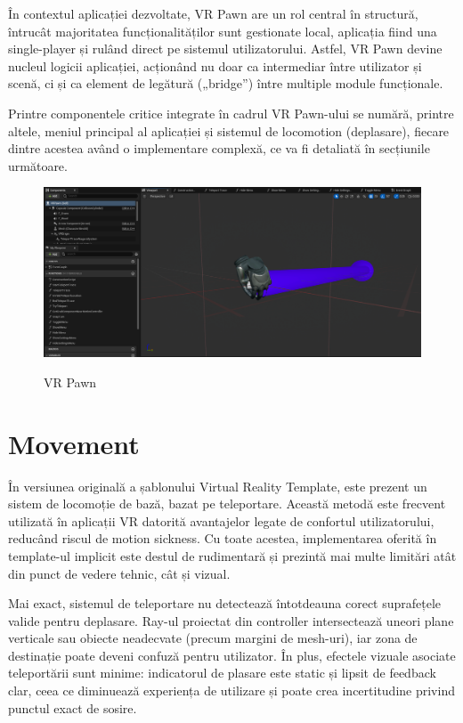 În contextul aplicației dezvoltate, VR Pawn are un rol central în structură, întrucât majoritatea funcționalităților sunt gestionate local, aplicația fiind una single-player și rulând direct pe sistemul utilizatorului. Astfel, VR Pawn devine nucleul logicii aplicației, acționând nu doar ca intermediar între utilizator și scenă, ci și ca element de legătură („bridge”) între multiple module funcționale.

Printre componentele critice integrate în cadrul VR Pawn-ului se numără, printre altele, meniul principal al aplicației și sistemul de locomotion (deplasare), fiecare dintre acestea având o implementare complexă, ce va fi detaliată în secțiunile următoare.

\begin{figure} [htp] 
\centering 
\includegraphics [width=12cm]
{continut/capitol3/figuri/VR_Pawn.png} 
\label{fig:VR_Pawn} 
    \caption{VR Pawn}
\end{figure}

\section{Movement}

În versiunea originală a șablonului Virtual Reality Template, este prezent un sistem de locomoție de bază, bazat pe teleportare. Această metodă este frecvent utilizată în aplicații VR datorită avantajelor legate de confortul utilizatorului, reducând riscul de motion sickness. Cu toate acestea, implementarea oferită în template-ul implicit este destul de rudimentară și prezintă mai multe limitări atât din punct de vedere tehnic, cât și vizual.

Mai exact, sistemul de teleportare nu detectează întotdeauna corect suprafețele valide pentru deplasare. Ray-ul proiectat din controller intersectează uneori plane verticale sau obiecte neadecvate (precum margini de mesh-uri), iar zona de destinație poate deveni confuză pentru utilizator. În plus, efectele vizuale asociate teleportării sunt minime: indicatorul de plasare este static și lipsit de feedback clar, ceea ce diminuează experiența de utilizare și poate crea incertitudine privind punctul exact de sosire.


